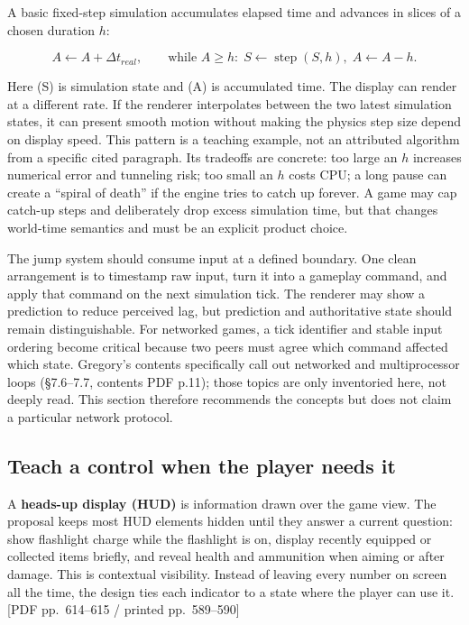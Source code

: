 A basic fixed-step simulation accumulates elapsed time and advances in slices of a chosen duration \(h\):

\[
A \leftarrow A + \Delta t_{real}, \qquad
\text{while } A \ge h: \; S \leftarrow \operatorname{step}(S,h),\; A \leftarrow A-h.
\]

Here (S) is simulation state and (A) is accumulated time. The display can render at a different rate. If the renderer interpolates between the two latest simulation states, it can present smooth motion without making the physics step size depend on display speed. This pattern is a teaching example, not an attributed algorithm from a specific cited paragraph. Its tradeoffs are concrete: too large an \(h\) increases numerical error and tunneling risk; too small an \(h\) costs CPU; a long pause can create a ``spiral of death'' if the engine tries to catch up forever. A game may cap catch-up steps and deliberately drop excess simulation time, but that changes world-time semantics and must be an explicit product choice.

The jump system should consume input at a defined boundary. One clean arrangement is to timestamp raw input, turn it into a gameplay command, and apply that command on the next simulation tick. The renderer may show a prediction to reduce perceived lag, but prediction and authoritative state should remain distinguishable. For networked games, a tick identifier and stable input ordering become critical because two peers must agree which command affected which state. Gregory's contents specifically call out networked and multiprocessor loops (§7.6--7.7, contents PDF p.11); those topics are only inventoried here, not deeply read. This section therefore recommends the concepts but does not claim a particular network protocol.

\subsection{Teach a control when the player needs it}\label{05-engine-i-ch014-teach-a-control-when-the-player-needs-it}

\hypertarget{05-engine-i-ch014-teach-a-control-when-the-player-needs-it}{}

A \textbf{heads-up display (HUD)} is information drawn over the game view. The proposal keeps most HUD elements hidden until they answer a current question: show flashlight charge while the flashlight is on, display recently equipped or collected items briefly, and reveal health and ammunition when aiming or after damage. This is contextual visibility. Instead of leaving every number on screen all the time, the design ties each indicator to a state where the player can use it. {[}PDF pp.~614--615 / printed pp.~589--590{]}

